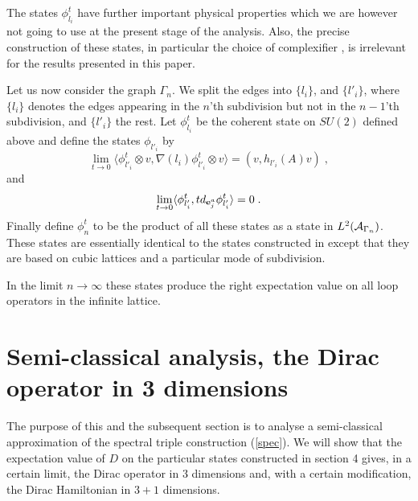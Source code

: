 \documentclass[12pt]{article}
\def\G{\Gamma}
\def\ca{{\cal A}}
\newcommand{\bbC}{{\Bbb C}}
\begin{document}
 The states $\phi^t_{l_i}$  have further important physical properties which we are however not going to use at the present stage of the analysis. Also, the precise construction of these states, in particular the choice of complexifier \cite{TW}, is irrelevant for the results presented in this paper. 


Let us now consider the graph $\G_n$. We split the edges into $\{ l_i \}$, and $\{ l'_i\}$, where $\{ l_i\}$ denotes the edges appearing in the $n$'th subdivision but not in the $n-1$'th subdivision, and $\{ l'_i \}$ the rest. Let
$\phi^t_{l_i}$ be the coherent state on $SU(2)$ defined above and
define the states $\phi_{l'_i}$ by
$$\lim_{t \to 0}\langle \phi^t_{l'_i} \otimes v ,\nabla(l_i) \phi^t_{l'_i}\otimes  v \rangle =  (v,h_{l'_i}(A)v)\;,$$
and
$$\lim_{t \to 0}\langle \phi^t_{l'_i} , t d_{{\bf e}_j^a} \phi^t_{l'_i}\rangle = 0\;.$$
Finally define $\phi^t_n$ to be the product of all these states as a state in $L^2(\ca_{\Gamma_n})$. These states are essentially identical to the states constructed in \cite{TW} except that they are based on cubic lattices and a particular mode of subdivision.


In the limit $n\rightarrow\infty$ these states produce the right expectation value on all loop operators in the infinite lattice.











\section{Semi-classical analysis, the Dirac operator in 3 dimensions}


The purpose of this and the subsequent section is to analyse a semi-classical approximation of the spectral triple construction (\ref{spec}).  We will show that the expectation value of $D$ on the particular states constructed in section 4 gives, in a certain limit, the Dirac operator in 3 dimensions and, with a certain modification, the Dirac Hamiltonian in $3+1$ dimensions.
\end{document}

